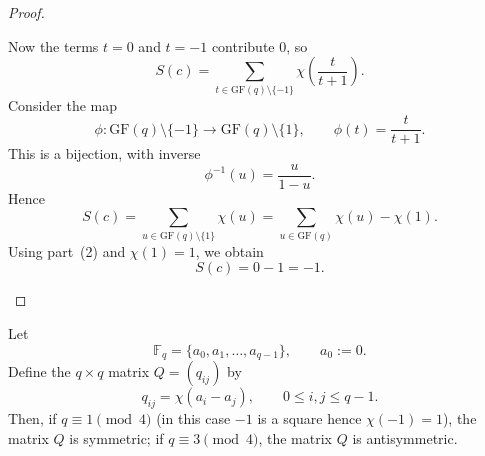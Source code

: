 \documentclass[11pt, a4paper]{ctexrep}
\begin{document}
\begin{proof}
\begin{enumerate}
              Now the terms $t=0$ and $t=-1$ contribute $0$, so
              \[
                  S(c)=\sum_{t\in \mathrm{GF}(q)\setminus\{-1\}}\chi\!\left(\frac{t}{t+1}\right).
              \]
              Consider the map
              \[
                  \phi:\mathrm{GF}(q)\setminus\{-1\}\longrightarrow \mathrm{GF}(q)\setminus\{1\},
                  \qquad
                  \phi(t)=\frac{t}{t+1}.
              \]
              This is a bijection, with inverse
              \[
                  \phi^{-1}(u)=\frac{u}{1-u}.
              \]
              Hence
              \[
                  S(c)=\sum_{u\in \mathrm{GF}(q)\setminus\{1\}}\chi(u)
                  =\sum_{u\in \mathrm{GF}(q)}\chi(u)-\chi(1).
              \]
              Using part~(2) and $\chi(1)=1$, we obtain
              \[
                  S(c)=0-1=-1.
              \]
    \end{enumerate}
\end{proof}

\begin{definition}
    Let
    \[
        \mathbb{F}_q=\{a_0,a_1,\dots,a_{q-1}\},
        \qquad a_0:=0.
    \]
    Define the \(q\times q\) matrix \(Q=(q_{ij})\) by
    \[
        q_{ij}=\chi(a_i-a_j),
        \qquad 0\leqslant i,j\leqslant q-1.
    \]
    Then, if \(q\equiv 1 \pmod{4}\) (in this case $-1$ is a square hence $\chi(-1)=1$), the matrix \(Q\) is symmetric; if \(q\equiv 3 \pmod{4}\), the matrix \(Q\) is antisymmetric.
\end{definition}
\end{document}
